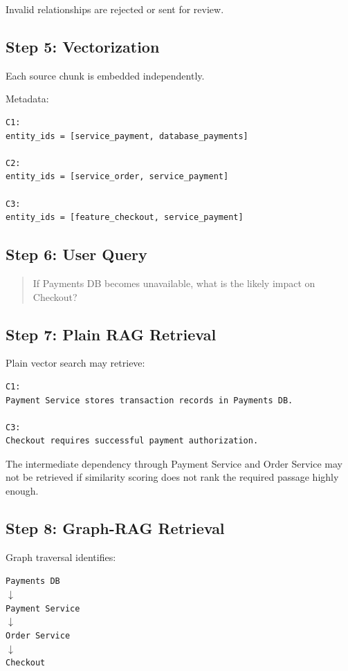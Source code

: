 \documentclass[11pt,a4paper]{article}
\begin{document}
Invalid relationships are rejected or sent for review.

\subsection{Step 5: Vectorization}

Each source chunk is embedded independently.

Metadata:

\begin{lstlisting}
C1:
entity_ids = [service_payment, database_payments]

C2:
entity_ids = [service_order, service_payment]

C3:
entity_ids = [feature_checkout, service_payment]
\end{lstlisting}

\subsection{Step 6: User Query}

\begin{quote}
If Payments DB becomes unavailable, what is the likely impact on Checkout?
\end{quote}

\subsection{Step 7: Plain RAG Retrieval}

Plain vector search may retrieve:

\begin{lstlisting}
C1:
Payment Service stores transaction records in Payments DB.

C3:
Checkout requires successful payment authorization.
\end{lstlisting}

The intermediate dependency through Payment Service and Order Service may not be retrieved if similarity scoring does not rank the required passage highly enough.

\subsection{Step 8: Graph-RAG Retrieval}

Graph traversal identifies:

\begin{center}
\texttt{Payments DB}\\
$\downarrow$\\
\texttt{Payment Service}\\
$\downarrow$\\
\texttt{Order Service}\\
$\downarrow$\\
\texttt{Checkout}
\end{center}
\end{document}
